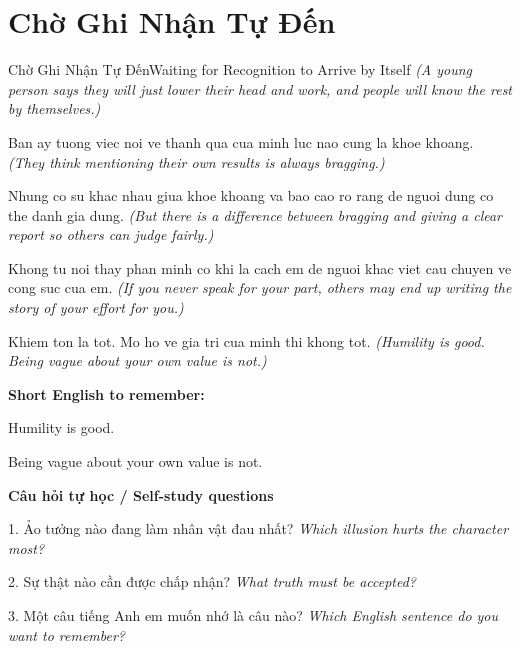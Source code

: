 \section{Chờ Ghi Nhận Tự Đến}
\begin{truyen}{Chờ Ghi Nhận Tự Đến}{Waiting for Recognition to Arrive by Itself}
\textit{(A young person says they will just lower their head and work, and people will know the rest by themselves.)}

Ban ay tuong viec noi ve thanh qua cua minh luc nao cung la khoe khoang.
\textit{(They think mentioning their own results is always bragging.)}

Nhung co su khac nhau giua khoe khoang va bao cao ro rang de nguoi dung co the danh gia dung.
\textit{(But there is a difference between bragging and giving a clear report so others can judge fairly.)}

Khong tu noi thay phan minh co khi la cach em de nguoi khac viet cau chuyen ve cong suc cua em.
\textit{(If you never speak for your part, others may end up writing the story of your effort for you.)}

\end{truyen}

\begin{baihoc}
Khiem ton la tot. Mo ho ve gia tri cua minh thi khong tot.
\textit{(Humility is good. Being vague about your own value is not.)}
\end{baihoc}

\begin{ghinhoanh}
\textbf{Short English to remember:}

Humility is good.

Being vague about your own value is not.

\end{ghinhoanh}

\begin{tuhocnhanh}
\textbf{Câu hỏi tự học / Self-study questions}

1. Ảo tưởng nào đang làm nhân vật đau nhất? \textit{Which illusion hurts the character most?}

2. Sự thật nào cần được chấp nhận? \textit{What truth must be accepted?}

3. Một câu tiếng Anh em muốn nhớ là câu nào? \textit{Which English sentence do you want to remember?}
\end{tuhocnhanh}
\ngancach

